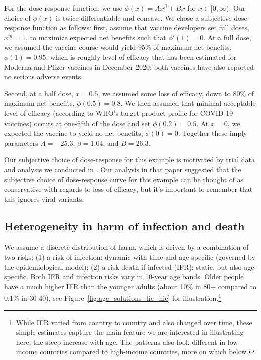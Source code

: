 \documentclass[12pt]{article}
\begin{document}
For the dose-response function, we use $\phi(x) = Ax^\beta + Bx$ for $x \in [0,\infty)$. Our choice of $\phi(x)$ is twice differentiable and concave. We chose a subjective dose-response function as follows: first, assume that vaccine developers set full doses, $x^m=1$, to maximize expected net benefits such that $\phi'(1)=0$. At a full dose, we assumed the vaccine course would yield 95\% of maximum net benefits, $\phi(1)=0.95$, which is roughly level of efficacy that has been estimated for Moderna and Pfizer vaccines in December 2020; both vaccines have also reported no serious adverse events.

Second, at a half dose, $x=0.5$, we assumed some loss of efficacy, down to 80\% of maximum net benefits, $\phi(0.5)=0.8$. We then assumed that minimal acceptable level of efficacy (according to WHO's target product profile for COVID-19 vaccines) occurs at one-fifth of the dose and set $\phi(0.2) = 0.5$. At $x=0$, we expected the vaccine to yield no net benefits, $\phi(0)=0$.  Together these imply parameters $A=-25.3$, $\beta = 1.04$, and $B=26.3$. 

Our subjective choice of dose-response for this example is motivated by trial data and analysis we conducted in \cite{wiecek_pnas_2021}. Our analysis in that paper suggested that the subjective choice of dose-response curve for this example can be thought of as conservative with regards to loss of efficacy, but it's important to remember that this ignores viral variants.



\subsection{Heterogeneity in harm of infection and death}

We assume a discrete distribution of harm, which is driven by a combination of two risks; (1) a risk of infection: dynamic with time and age-specific (governed by the epidemiological model); (2) a risk death if infected (IFR): static, but also age-specific. Both IFR and infection risks vary in 10-year age bands. Older people have a much higher IFR than the younger adults (about 10\% in 80+ compared to 0.1\% in 30-40), see Figure~\ref{fig:age_solutions_lic_hic} for illustration.\footnote{While IFR varied from country to country and also changed over time, these simple estimates capture the main feature we are interested in illustrating here, the steep increase with age. The patterns also look different in low-income countries compared to high-income countries, more on which below.} 
\end{document}
